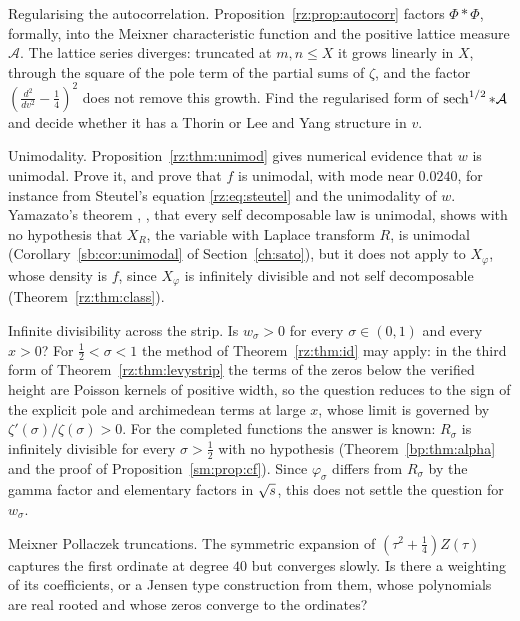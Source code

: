 \begin{problem}\label{rz:prob:meixner}
Regularising the autocorrelation. Proposition~\ref{rz:prop:autocorr} factors $\Phi*\Phi$, formally, into the Meixner characteristic function and the positive lattice measure $\mathcal A$. The lattice series diverges: truncated at $m,n\le X$ it grows linearly in $X$, through the square of the pole term of the partial sums of $\zeta$, and the factor $(\frac{d^2}{dv^2}-\frac14)^2$ does not remove this growth. Find the regularised form of $\operatorname{sech}^{1/2}*\mathcal A$ and decide whether it has a Thorin or Lee and Yang structure in $v$.
\end{problem}

\begin{problem}\label{rz:prob:unimodal}
Unimodality. Proposition~\ref{rz:thm:unimod} gives numerical evidence that $w$ is unimodal. Prove it, and prove that $f$ is unimodal, with mode near $0.0240$, for instance from Steutel's equation \eqref{rz:eq:steutel} and the unimodality of $w$. Yamazato's theorem \cite{Yamazato78}, \cite[Theorem 53.1]{Sato99}, that every self decomposable law is unimodal, shows with no hypothesis that $X_R$, the variable with Laplace transform $R$, is unimodal (Corollary~\ref{sb:cor:unimodal} of Section~\ref{ch:sato}), but it does not apply to $X_\varphi$, whose density is $f$, since $X_\varphi$ is infinitely divisible and not self decomposable (Theorem~\ref{rz:thm:class}).
\end{problem}

\begin{problem}\label{rz:prob:strip}
Infinite divisibility across the strip. Is $w_\sigma>0$ for every $\sigma\in(0,1)$ and every $x>0$? For $\frac12<\sigma<1$ the method of Theorem~\ref{rz:thm:id} may apply: in the third form of Theorem~\ref{rz:thm:levystrip} the terms of the zeros below the verified height are Poisson kernels of positive width, so the question reduces to the sign of the explicit pole and archimedean terms at large $x$, whose limit is governed by $\zeta'(\sigma)/\zeta(\sigma)>0$. For the completed functions the answer is known: $R_\sigma$ is infinitely divisible for every $\sigma>\frac12$ with no hypothesis (Theorem~\ref{bp:thm:alpha} and the proof of Proposition~\ref{sm:prop:cf}). Since $\varphi_\sigma$ differs from $R_\sigma$ by the gamma factor and elementary factors in $\sqrt{s}$, this does not settle the question for $w_\sigma$.
\end{problem}

\begin{problem}\label{rz:prob:mptrunc}
Meixner Pollaczek truncations. The symmetric expansion of $(\tau^2+\frac14)Z(\tau)$ captures the first ordinate at degree $40$ but converges slowly. Is there a weighting of its coefficients, or a Jensen type construction from them, whose polynomials are real rooted and whose zeros converge to the ordinates?
\end{problem}


